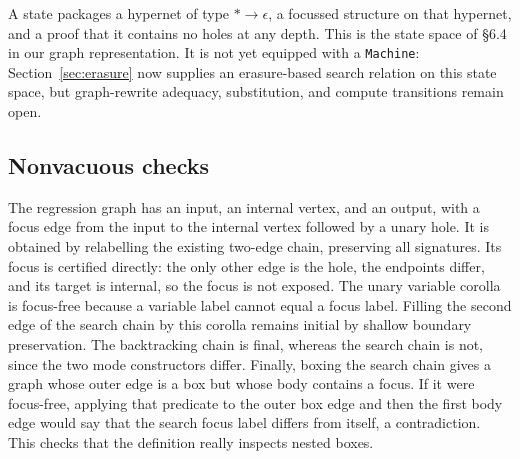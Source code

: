\begin{definition}\label{term:concrete-state}
A state packages a hypernet of type $*\to\epsilon$, a focussed structure on that
hypernet, and a proof that it contains no holes at any depth. This is the state
space of \S6.4 in our graph representation. It is not yet equipped with a
\texttt{Machine}: Section~\ref{sec:erasure} now supplies an erasure-based search relation on this
state space, but graph-rewrite adequacy, substitution, and compute transitions
remain open.
\end{definition}

\subsection{Nonvacuous checks}
The regression graph has an input, an internal vertex, and an output, with a
focus edge from the input to the internal vertex followed by a unary hole.
It is obtained by relabelling the existing two-edge chain, preserving all
signatures. Its focus is certified directly: the only other edge is the hole,
the endpoints differ, and its target is internal, so the focus is not exposed.
The unary variable corolla is focus-free because a variable label cannot equal
a focus label. Filling the second edge of the search chain by this corolla
remains initial by shallow boundary preservation. The backtracking chain is
final, whereas the search chain is not, since the two mode constructors differ.
Finally, boxing the search chain gives a graph whose outer edge is a box but
whose body contains a focus. If it were focus-free, applying that predicate to
the outer box edge and then the first body edge would say that the search focus
label differs from itself, a contradiction. This checks that the definition
really inspects nested boxes.
